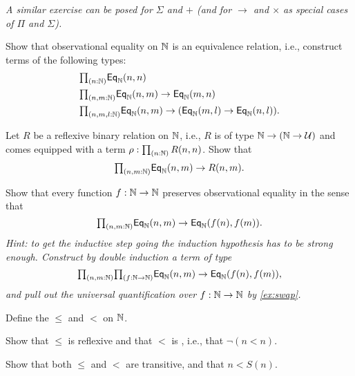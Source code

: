\begin{exercises}
  \emph{A similar exercise can be posed for $\Sigma$ and $+$ (and for $\to$ and $\times$ as special cases of $\Pi$ and $\Sigma$).}
\item \label{ex:obs_nat_eqrel}Show that observational equality on ${\mathbb{N}}$ is an equivalence relation, i.e., construct terms of the following types:
  \begin{align*}
    & \prd{n:\N} \EqN(n,n) \\
    & \prd{n,m:\N} \EqN(n,m)\to \EqN(m,n) \\
    & \prd{n,m,l:\N} \EqN(n,m)\to (\EqN(m,l)\to \EqN(n,l)).
  \end{align*}
\item \label{ex:obs_nat_least}Let $R$ be a reflexive binary relation on ${\mathbb{N}}$, i.e., $R$ is of type ${\mathbb{N}}\to ({\mathbb{N}}\to\mathcal{U})$ and comes equipped with a term $\rho:\prd{n:\N}R(n,n)$. Show that
  \begin{equation*}
    \prd{n,m:\N} \EqN(n,m)\to R(n,m).
  \end{equation*}
\item {}Show that every function $f:{\mathbb{N}}\to {\mathbb{N}}$ preserves observational equality in the sense that
  \begin{equation*}
    \prd{n,m:\N} \EqN(n,m)\to \EqN(f(n),f(m)).
  \end{equation*}
  \emph{Hint: to get the inductive step going the induction hypothesis has to be strong enough. Construct by double induction a term of type}
  \begin{equation*}
    \prd{n,m:\N}{f:\N\to\N} \EqN(n,m)\to \EqN(f(n),f(m)),
  \end{equation*}
  \emph{and pull out the universal quantification over $f:{\mathbb{N}}\to{\mathbb{N}}$ by \cref{ex:swap}.}
\item 
  \begin{subexenum}
  \item Define the  $\leq$ and $<$ on ${\mathbb{N}}$.
  \item Show that $\leq$ is reflexive and that $<$ is , i.e., that $\neg(n<n)$. 
  \item Show that both $\leq$ and $<$ are transitive, and that $n<S(n)$.

\end{subexenum}
\end{exercises}
